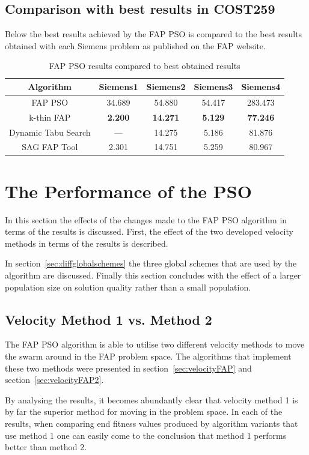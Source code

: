 \subsection{Comparison with best results in COST259}
Below the best results achieved by the FAP PSO is compared to the best results obtained with each Siemens problem as published on the FAP website\cite{FAPWeb}.
\begin{table}[H]
\centering
	\begin{tabular}{| c | c | c | c | c |}
	\hline
	Algorithm & Siemens1 & Siemens2 & Siemens3 & Siemens4 \\ \hline
	FAP PSO & 34.689 & 54.880 & 54.417 & 283.473 \\ \hline
	k-thin FAP & \textbf{2.200} & \textbf{14.271} & \textbf{5.129} & \textbf{77.246} \\ \hline
	Dynamic Tabu Search & --- & 14.275 & 5.186 & 81.876 \\ \hline
	SAG FAP Tool & 2.301 & 14.751 & 5.259 & 80.967 \\ \hline
	\end{tabular}
\caption{FAP PSO results compared to best obtained results}
\label{tab:siem4m2}
\end{table}
\section{The Performance of the PSO}
In this section the effects of the changes made to the FAP PSO algorithm in terms of the results is discussed. First, the effect of the two developed velocity methods in terms of the results is described. 

In section~\ref{sec:diffglobalschemes} the three global schemes that are used by the algorithm are discussed. Finally this section concludes with the effect of a larger population size on solution quality rather than a small population.
\subsection{Velocity Method 1 vs. Method 2}
The FAP PSO algorithm is able to utilise two different velocity methods to move the swarm around in the FAP problem space. The algorithms that implement these two methods were presented in section~\ref{sec:velocityFAP} and section~\ref{sec:velocityFAP2}.

By analysing the results, it becomes abundantly clear that velocity method 1 is by far the superior method for moving in the problem space. In each of the results, when comparing end fitness values produced by algorithm variants that use method 1 one can easily come to the conclusion that method 1 performs better than method 2.

